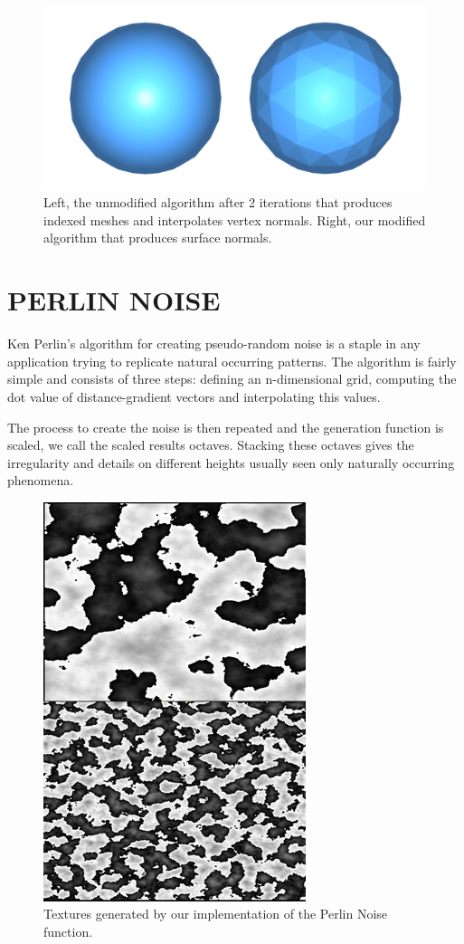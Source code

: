 \documentclass[a4paper,twoside]{article}
\begin{document}
\begin{figure}
\includegraphics[scale=0.24]{./images/icospheres/icospheresnormals.png}
\caption{Left, the unmodified algorithm after 2 iterations that produces indexed meshes and interpolates vertex normals. Right, our modified algorithm that produces surface normals.}
\label{fig_isn}
\end{figure}

\section{\uppercase{Perlin Noise}}
\label{sec:pnoise}
\noindent Ken Perlin's algorithm for creating pseudo-random noise is a staple in any application trying to replicate natural occurring patterns. The algorithm is fairly simple and consists of three steps: defining an n-dimensional grid, computing the dot value of distance-gradient vectors and interpolating this values.

The process to create the noise is then repeated and the generation function is scaled, we call the scaled results octaves. Stacking these octaves gives the irregularity and details on different heights usually seen only naturally occurring phenomena. 

\begin{figure}
\centering
\includegraphics[scale=0.5]{./images/perlin_noise/combined.png}
\caption{Textures generated by our implementation of the Perlin Noise function.}
\label{fig_pn}
\end{figure}
\end{document}
